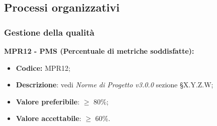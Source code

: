 \subsection{Processi organizzativi}
\subsubsection{Gestione della qualità}
\textbf{MPR12 - PMS (Percentuale di metriche soddisfatte):}
\begin{itemize}
    \item \textbf{Codice:} MPR12;
    \item \textbf{Descrizione}: vedi \textit{Norme di Progetto v3.0.0} sezione \S X.Y.Z.W;
    \item \textbf{Valore preferibile}: $\geq$ 80\%;
    \item \textbf{Valore accettabile}: $\geq$ 60\%.
\end{itemize}
\newpage
